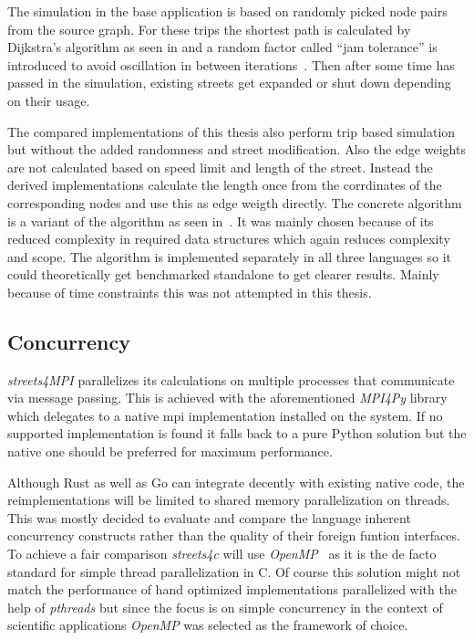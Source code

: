 The simulation in the base application is based on randomly picked node pairs from the source graph. For these trips the shortest path is calculated by Dijkstra's algorithm as seen in \cite{cormen} and a random factor called ``jam tolerance'' is introduced to avoid oscillation in between iterations~\cite{streets_report}. Then after some time has passed in the simulation, existing streets get expanded or shut down depending on their usage.

The compared implementations of this thesis also perform trip based simulation but without the added randomness and street modification. Also the edge weights are not calculated based on speed limit and length of the street. Instead the derived implementations calculate the length once from the corrdinates of the corresponding nodes and use this as edge weigth directly. The concrete algorithm is a variant of the  algorithm as seen in~\cite[p. 16]{dijkstra_utcs}. It was mainly chosen because of its reduced complexity in required data structures which again reduces complexity and scope. The algorithm is implemented separately in all three languages so it could theoretically get benchmarked standalone to get clearer results. Mainly because of time constraints this was not attempted in this thesis.

\subsection*{Concurrency}
\label{subsec:Concept::Differences::Concurrency}

\textit{streets4MPI} parallelizes its calculations on multiple processes that communicate via message passing. This is achieved with the aforementioned \textit{MPI4Py} library which delegates to a native \gls{mpi} implementation installed on the system. If no supported implementation is found it falls back to a pure Python solution but the native one should be preferred for maximum performance.

Although Rust as well as Go can integrate decently with existing native code, the reimplementations will be limited to shared memory parallelization on threads. This was mostly decided to evaluate and compare the language inherent concurrency constructs rather than the quality of their foreign funtion interfaces. To achieve a fair comparison \textit{streets4c} will use \textit{OpenMP}~ as it is the de facto standard for simple thread parallelization in C. Of course this solution might not match the performance of hand optimized implementations parallelized with the help of \textit{pthreads} but since the focus is on simple concurrency in the context of scientific applications \textit{OpenMP} was selected as the framework of choice.

